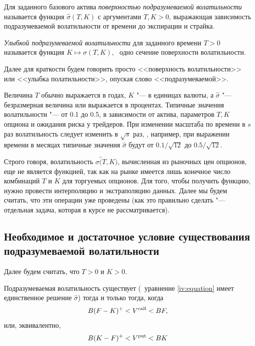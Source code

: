 \begin{definition}
\label{iv:d:surface}
Для заданного базового актива \emph{поверхностью подразумеваемой волатильности}  называется функция $\hat\sigma(T,K)$ с аргументами $T,K> 0$, выражающая зависимость подразумеваемой волатильности от времени до экспирации  и страйка.

\emph{Улыбкой подразумеваемой волатильности} для заданного времени $T>0$ называется функция $K\mapsto\sigma(T,K)$, \te\ одно сечение поверхности волатильности.
\end{definition}

Далее для краткости будем говорить просто <<поверхность волатильности>> или <<улыбка полатильности>>, опуская слово <<подразумеваемой>>.

\begin{remark}
Величина $T$ обычно выражается в годах, $K$ "--- в единицах валюты, а $\hat\sigma$ "--- безразмерная величина или выражается в процентах.
Типичные значения волатильности "--- от 0.1 до 0.5, в зависимости от актива, параметров $T,K$ опциона и ожидания риска у трейдеров.
При изменении масштаба по времени в $s$ раз волатильность следует изменить в $\sqrt{s}$ раз, \te, например, при выражении времени в месяцах типичные значения $\hat\sigma$ будут от $0.1/\sqrt{12}$ до $0.5/\sqrt{12}$.
\end{remark}

\begin{remark}
Строго говоря, волатильность $\sigma\hat(T,K)$, вычисленная из рыночных цен опционов, еще не является функцией, так как на рынке имеется лишь конечное число комбинаций $T$ и $K$ для торгуемых опционов.
Для того, чтобы получить функцию, нужно провести интерполяцию и экстраполяцию данных.
Далее мы будем считать, что эти операции уже проведены (как это правильно сделать "--- отдельная задача, которая в курсе не рассматривается).
\end{remark}


\subsection{Необходимое и достаточное условие существования подразумеваемой волатильности}
Далее будем считать, что $T>0$ и $K>0$.

\begin{proposition}
\label{iv:p:existence}
Подразумеваемая волатильность существует (\te\ уравнение \eqref{iv:equation} имеет единственное решение $\hat\sigma$) тогда и только тогда, когда
\begin{equation}
\label{iv:call-bounds}
B(F-K)^+ < V^{\text{\normalfont call}} < BF,
\end{equation}
или, эквивалентно,
\begin{equation}
\label{iv:put-bounds}
B(K-F)^+ < V^{\text{\normalfont put}} < BK
\end{equation}
\end{proposition}

